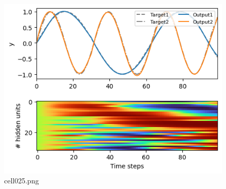 \begin{figure}[ht]
	\centering
	\includegraphics[scale=0.8, max width=\linewidth]{./fig/solve-credit-assignment-problem/bptt/cell025.png}
	\caption{cell025.png}
	\label{cell025.png}
\end{figure}
